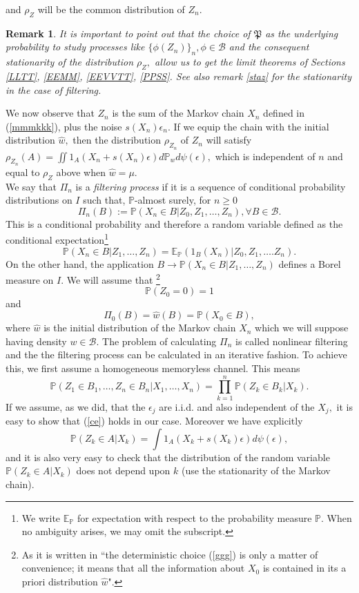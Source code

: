 \documentclass{article}
\newcommand{\1}{\mathbbm{1}}
\newtheorem{remark}[theorem]{Remark}
\begin{document}
and $\rho_Z$ will be the common distribution of  $Z_n.$\\
\begin{remark}\label{Rem:ChoiceOfP}
    It is important to point out that the choice of $\mathfrak{P}$ as the underlying probability to study processes like $\{\phi(Z_n)\}_n, \phi \in \mathcal{B}$ and the consequent stationarity of the distribution $\rho_Z,$ allow us to get the limit theorems of Sections \ref{LLTT}, \ref{EEMM}, \ref{EEVVTT}, \ref{PPSS}. See also remark \ref{staz} for the stationarity in the case of filtering.
\end{remark}
We now observe that  $Z_n$ is the sum of the Markov chain $X_n$ defined in (\ref{mmmkkk}), plus the noise $s(X_n)\epsilon_n.$  If we equip the chain with the initial distribution $\hat{w},$ then the distribution $\rho_{Z_n}$ of $Z_n$ will satisfy
$\rho_{Z_n}(A)=\iint 1_A(X_n+s(X_n)\epsilon)d\mathbb{P}_{\hat{w}}d\psi(\epsilon),$ which is independent of $n$ and equal to $\rho_Z$ above when $\hat{w}=\mu.$\\

We say that $\Pi_n$ is a {\em filtering process}  if it is a sequence of  conditional probability distributions  on $I$ such that, $\mathbb{P}$-almost surely, for $n\ge 0$
$$
\Pi_n(B):=\mathbb{P}(X_n\in B|Z_0,Z_1,\dots, Z_n), \forall B\in \mathcal{B}.
$$
This is a conditional probability and therefore a random variable defined as the conditional expectation\footnote{We write $\mathbb{E}_{\mathbb{P}}$ for expectation with respect to the probability measure $\mathbb{P}$. When no ambiguity arises, we may omit the subscript.}
$$
\mathbb{P}(X_n\in B|Z_1,\dots, Z_n)=\mathbb{E}_{\mathbb{P}}(1_B(X_n)|Z_0,Z_1,\dots. Z_n).
$$
On the other hand, the application $B\rightarrow \mathbb{P}(X_n\in B|Z_1,\dots, Z_n)$ defines a Borel measure on $I.$
We will assume that \footnote{As it is written in \cite{CH} ``the
deterministic choice (\ref{ggg}) is only a matter of convenience; it means that all the
information about $X_0$ is contained in its a priori distribution $\hat{w}$".}   
\begin{equation}\label{ggg}
\mathbb{P}(Z_0=0)=1
\end{equation}
and 
$$
\Pi_0(B)=\hat{w}(B)=\mathbb{P}(X_0\in B),
$$
where $\hat{w}$ is the initial distribution of the Markov chain $X_n$ which we will suppose having density $w\in \mathcal{B}.$ 
The problem of calculating $\Pi_n$ is called nonlinear filtering and the  the filtering process
can be calculated in an iterative fashion.  To achieve this, we first assume a homogeneous memoryless channel. This means
\begin{equation}\label{ce}
\mathbb{P}(Z_1\in B_1,\dots,Z_n\in B_n|X_1,\dots,X_n)=\prod_{k=1}^n\mathbb{P}(Z_k\in B_k|X_k).
\end{equation}
If we assume, as we did, that the $\epsilon_j$ are i.i.d. and also independent of the $X_j,$ it is easy to show that (\ref{ce}) holds in our case. Moreover we have explicitly
$$
\mathbb{P}(Z_k\in A|X_k)=\int 1_{A}(X_k+s(X_k)\epsilon)d\psi(\epsilon),
$$
and it is also very easy to check that the distribution of the random variable $\mathbb{P}(Z_k\in A|X_k)$ does not depend upon $k$ (use the stationarity of the Markov chain). \\
\end{document}
